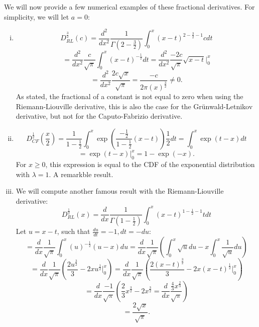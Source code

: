 We will now provide a few numerical examples of these fractional derivatives. For simplicity, we will let \(a = 0\):
\begin{example}
    \begin{enumerate}[(i)]
        \item 
    
    \[D^{\frac{3}{2}}_{RL}(c) = \frac{d^2}{dx^2} \frac{1}{\Gamma(2 - \frac{3}{2})}  \int_{0}^{x} (x-t)^{2 - \frac{3}{2}-1} c dt\]
    \[= \frac{d^2}{dx^2} \frac{c}{\sqrt{\pi}}  \int_{0}^{x} (x-t)^{- \frac{1}{2}} dt = \frac{d^2}{dx^2} \frac{-2c}{\sqrt{\pi}} \sqrt{x - t} \Big|_{0}^{x}\]
    \[= \frac{d^2}{dx^2} \frac{2c \sqrt{x}}{\sqrt{\pi}} = \frac{-c}{2\pi(x)^\frac{3}{2}} \neq 0.\] As stated, the fractional of a constant is not equal to zero when using the Riemann-Liouville derivative, this is also the case for the Grünwald-Letnikov derivative, but not for the Caputo-Fabrizio derivative.
    \item \[D^{\frac{1}{2}}_{CF}(\frac{x}{2}) = \frac{1}{1 - \frac{1}{2}}  \int_{0}^{x} \exp(\frac{-\frac{1}{2}}{1 - \frac{1}{2}}(x-t)) \frac{1}{2} dt = \int_{0}^{x} \exp(t - x) dt\]
    \[ =  \exp(t - x) \Big|_{0}^{x} = 1 - \exp(- x).\]
    For \(x \geq 0\), this expression is equal to the CDF of the exponential distribution with \(\lambda = 1\). A remarkble result.
    \item We will compute another famous result with the Riemann-Liouville derivative:
    \[D^{\frac{1}{2}}_{RL}(x) = \frac{d}{dx} \frac{1}{\Gamma(1 - \frac{1}{2})}  \int_{0}^{x} (x-t)^{1 - \frac{1}{2}-1} t dt\]
    Let \( u = x - t\), such that \(\frac{du}{dt} = -1, dt = -du\):
    \[=  \frac{d}{dx} \frac{1}{\sqrt{\pi}} \int_{0}^{x} (u)^{-\frac{1}{2}} (u - x) du =  \frac{d}{dx} \frac{1}{\sqrt{\pi}}(\int_{0}^{x} \sqrt{u} du - x\int_{0}^{x} \frac{1}{\sqrt{u}} du)\]
    \[ = \frac{d}{dx} \frac{1}{\sqrt{\pi}}(\frac{2u^\frac{3}{2}}{3} - 2 x u^\frac{1}{2} \Big|_{0}^{x}) = \frac{d}{dx} \frac{1}{\sqrt{\pi}}(\frac{2(x - t)^\frac{3}{2}}{3} - 2 x (x - t)^\frac{1}{2} \Big|_{0}^{x})\]
    \[=  \frac{d}{dx} \frac{-1}{\sqrt{\pi}}(\frac{2}{3}x^\frac{3}{2} - 2x^\frac{3}{2} = \frac{d}{dx} \frac{\frac{4}{3}x^\frac{2}{3}}{\sqrt{\pi}})\]
    \[ = \frac{2\sqrt{x}}{\sqrt{\pi}}.\]
    \end{enumerate}
\end{example}